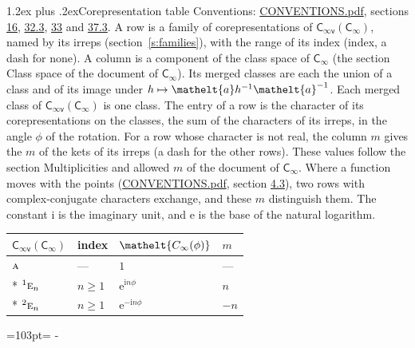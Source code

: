 \documentclass[10pt,a4paper]{article}
\makeatletter
\renewcommand\section{\@startsection{section}{1}{\z@}{-3ex plus -1ex minus -.2ex}%
  {1.2ex plus .2ex}{\normalfont\large\sffamily\bfseries\color{parttitle}}}
\newcommand{\needspace}[1]{\par\penalty-100\begingroup\dimen0=#1\relax\dimen2=\pagegoal
  \advance\dimen2-\pagetotal\ifdim\dimen0>\dimen2\relax\ifdim\dimen2>0pt\vfil\break\fi\fi
  \endgroup}
\numberwithin{equation}{section}
\newcommand{\eltfont}[1]{{\let\sigma\eltsigma\mathelt{#1}}}
\newcommand{\grp}[1]{\mathsf{#1}}
\newcommand{\irr}[1]{\text{\normalfont\scshape #1}}
\newcommand{\conjpair}[1]{{}^{#1}}
\newcommand{\comp}[1]{\eltfont{#1}}
\newcommand{\elt}[1]{\eltfont{#1}}
\newcommand{\iunit}{\mathrm{i}}
\newcommand{\expe}{\mathrm{e}}
\makeatother
\begin{document}
\section{Corepresentation table}\label{s:character_table}
Conventions: \href{../../CONVENTIONS.pdf}{CONVENTIONS.pdf}, sections \href{../../../rotation/CONVENTIONS.pdf\#conv.16}{16}, \href{../../CONVENTIONS.pdf\#conv.32.3}{32.3}, \href{../../CONVENTIONS.pdf\#conv.33}{33} and \href{../../CONVENTIONS.pdf\#conv.37.3}{37.3}.
A row is a family of corepresentations of $\grp{C_{\infty v}}(\grp{C_{\infty}})$, named by its irreps (section~\ref{s:families}), with the range of its index (index, a dash for none). A column is a component of the class space of $\grp{C_{\infty}}$ (the section Class space of the document of \href{../../../rotation/data/pdf/Cinf.pdf}{$\grp{C_{\infty}}$}). Its merged classes are each the union of a class and of its image under $h \mapsto \elt{a} h^{-1} \elt{a}^{-1}$. Each merged class of $\grp{C_{\infty v}}(\grp{C_{\infty}})$ is one class. The entry of a row is the character of its corepresentations on the classes, the sum of the characters of its irreps, in the angle $\phi$ of the rotation. For a row whose character is not real, the column $m$ gives the $m$ of the kets of its irreps (a dash for the other rows). These values follow the section Multiplicities and allowed $m$ of the document of \href{../../../rotation/data/pdf/Cinf.pdf}{$\grp{C_{\infty}}$}. Where a function moves with the points (\href{../../CONVENTIONS.pdf}{CONVENTIONS.pdf}, section \href{../../../rotation/CONVENTIONS.pdf\#conv.4.3}{4.3}), two rows with complex-conjugate characters exchange, and these $m$ distinguish them.
The constant $\iunit$ is the imaginary unit, and $\expe$ is the base of the natural logarithm.
{\small\begin{longtable}{@{}llll@{}}\toprule
$\grp{C_{\infty v}}(\grp{C_{\infty}})$ & index & $\comp{C_{\infty}(\phi)}$ & $m$\\\midrule\endhead
\bottomrule\endfoot\endlastfoot
$\irr{a}$ & --- & $1$ & ---\\*
$\conjpair{1}\irr{e}_{n}$ & $n \ge 1$ & $\expe^{\iunit n\phi}$ & $n$\\*
$\conjpair{2}\irr{e}_{n}$ & $n \ge 1$ & $\expe^{-\iunit n\phi}$ & $-n$\\
\bottomrule\end{longtable}}
\needspace{103pt}
\end{document}

